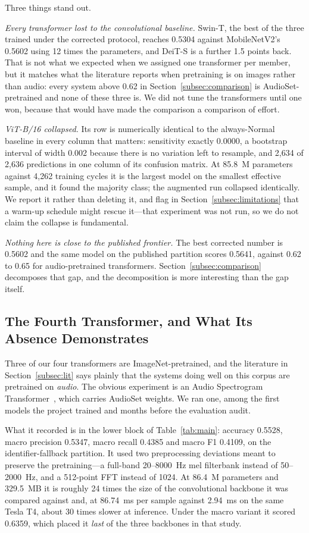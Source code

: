 \documentclass[journal,onecolumn]{IEEEtran}
\begin{document}
Three things stand out.

\emph{Every transformer lost to the convolutional baseline.} Swin-T, the best of the three
trained under the corrected protocol, reaches 0.5304 against MobileNetV2's 0.5602 using 12 times
the parameters, and DeiT-S is a further 1.5 points back. That is not what we expected when we
assigned one transformer per member, but it matches what the literature reports when
pretraining is on images rather than audio: every system above 0.62 in
Section~\ref{subsec:comparison} is AudioSet-pretrained and none of these three is. We did not
tune the transformers until one won, because that would have made the comparison a comparison
of effort.

\emph{ViT-B/16 collapsed.} Its row is numerically identical to the always-Normal baseline in
every column that matters: sensitivity exactly 0.0000, a bootstrap interval of width 0.002
because there is no variation left to resample, and 2,634 of 2,636 predictions in one column
of its confusion matrix. At 85.8~M parameters against 4,262 training cycles it is the largest
model on the smallest effective sample, and it found the majority class; the augmented run
collapsed identically. We report it rather than deleting it, and flag in
Section~\ref{subsec:limitations} that a warm-up schedule might rescue it---that experiment
was not run, so we do not claim the collapse is fundamental.

\emph{Nothing here is close to the published frontier.} The best corrected number is 0.5602
and the same model on the published partition scores 0.5641, against 0.62 to 0.65 for
audio-pretrained transformers. Section~\ref{subsec:comparison} decomposes that gap, and the
decomposition is more interesting than the gap itself.

\subsection{The Fourth Transformer, and What Its Absence Demonstrates}
\label{subsec:ast}

Three of our four transformers are ImageNet-pretrained, and the literature in
Section~\ref{subsec:lit} says plainly that the systems doing well on this corpus are
pretrained on \emph{audio}. The obvious experiment is an Audio Spectrogram
Transformer~\cite{gong2021ast}, which carries AudioSet weights. We ran one, among the first
models the project trained and months before the evaluation audit.

What it recorded is in the lower block of Table~\ref{tab:main}: accuracy 0.5528, macro
precision 0.5347, macro recall 0.4385 and macro F1 0.4109, on the identifier-fallback
partition. It used two preprocessing deviations meant to preserve the pretraining---a
full-band 20--8000~Hz mel filterbank instead of 50--2000~Hz, and a 512-point FFT instead of
1024. At 86.4~M parameters and 329.5~MB it is roughly 24 times the size of the convolutional
backbone it was compared against and, at 86.74~ms per sample against 2.94~ms on the same
Tesla T4, about 30 times slower at inference. Under the macro variant it scored 0.6359, which
placed it \emph{last} of the three backbones in that study.
\end{document}
